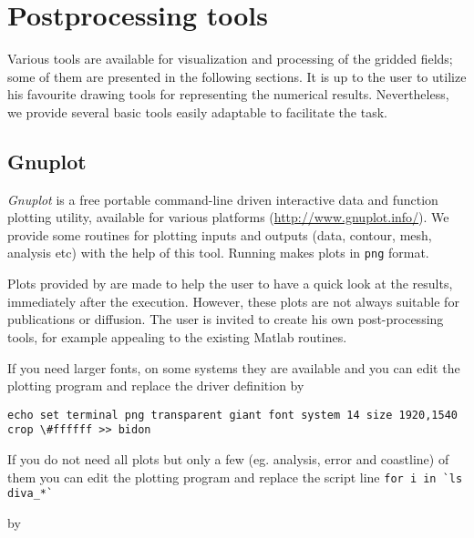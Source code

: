 \chapter{Postprocessing tools\label{chap:postprocessing}}

Various tools are available for visualization and processing of the gridded fields; some of them are presented in the following sections. It is up to the user to utilize his favourite drawing tools for representing the numerical results. Nevertheless, we provide several basic tools easily adaptable to facilitate the task.


\minitoc

\section{Gnuplot\label{sec:visugnuplot}}

\textsl{Gnuplot} is a free portable command-line driven interactive data and function plotting utility, available for various platforms (\url{http://www.gnuplot.info/}). We provide some routines for plotting \diva inputs and outputs (data, contour, mesh, analysis etc) with the help of this tool. Running  makes plots in \texttt{png} format. 

\begin{tips}
Plots provided by \gnuplot are made to help the user to have a quick look at the results, immediately after the execution. However, these plots are not always suitable for publications or diffusion. The user is invited to create his own post-processing tools, for example appealing to the existing Matlab routines.
\end{tips}

\begin{tips}
If you need larger fonts, on some systems they are available and you can edit the plotting program 
and replace the driver definition by
\begin{tiny}
\begin{verbatim}
echo set terminal png transparent giant font system 14 size 1920,1540 crop \#ffffff >> bidon
\end{verbatim}
\end{tiny}
\end{tips}

\begin{tips}
If you do not need all plots but only a few (eg. analysis, error and coastline) of them you can edit the plotting program  and replace the script line \verb#for i in `ls diva_*`# 

by
\end{tips}

